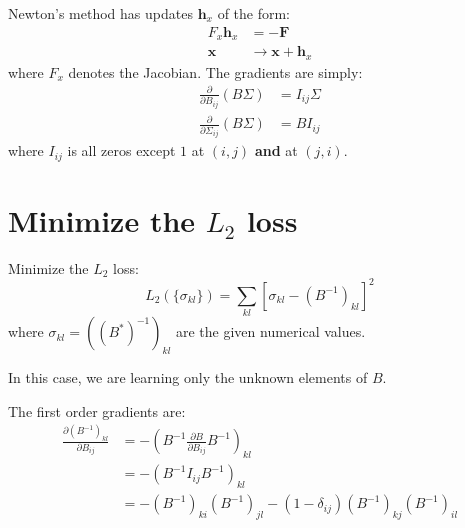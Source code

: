 \documentclass[11pt]{article}
\begin{document}
Newton's method has updates $\boldsymbol{h}_x$ of the form:
\begin{equation}
\begin{split}
F_x \boldsymbol{h}_x &= - \boldsymbol{F} \\
\boldsymbol{x} &\rightarrow \boldsymbol{x} + \boldsymbol{h}_x
\end{split}
\end{equation}
where $F_x$ denotes the Jacobian. The gradients are simply:
\begin{equation}
\begin{split}
\frac{\partial}{\partial B_{ij}} (B\Sigma) &= I_{ij} \Sigma \\
\frac{\partial}{\partial \Sigma_{ij}} (B\Sigma) &= B I_{ij}
\end{split}
\end{equation}
where $I_{ij}$ is all zeros except $1$ at $(i,j)$ \textbf{and} at $(j,i)$.


\section{Minimize the $L_2$ loss}


Minimize the $L_2$ loss:
\begin{equation}
L_2( \{ \sigma_{kl} \} ) = \sum_{kl} \left [ \sigma_{kl} - (B^{-1})_{kl} \right ]^2
\end{equation}
where $\sigma_{kl} = ((B^*)^{-1})_{kl}$ are the given numerical values.

In this case, we are learning only the unknown elements of $B$.

The first order gradients are:
\begin{equation}
\begin{split}
\frac{\partial (B^{-1})_{kl}}{\partial B_{ij}}
&= 
- \left ( B^{-1} \frac{\partial B}{\partial B_{ij}} B^{-1} \right )_{kl} \\
&= 
- \left ( B^{-1} I_{ij} B^{-1} \right )_{kl} \\
&=
- (B^{-1})_{ki} (B^{-1})_{jl} - (1 - \delta_{ij}) (B^{-1})_{kj} (B^{-1})_{il}
\end{split}
\end{equation}
\end{document}
